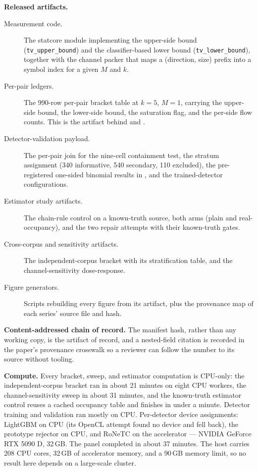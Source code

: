 \documentclass[letterpaper,twocolumn,10pt]{article}
\begin{document}
\textbf{Released artifacts.}
\begin{description}
  \item[Measurement code.] The statcore module implementing the upper-side
  bound (\texttt{tv\_upper\_bound}) and the classifier-based lower bound
  (\texttt{tv\_lower\_bound}), together with the channel packer that maps a
  (direction, size) prefix into a symbol index for a given $M$ and $k$.
  \item[Per-pair ledgers.] The 990-row per-pair bracket table at $k{=}5$,
  $M{=}1$, carrying the upper-side bound, the lower-side bound, the saturation
  flag, and the per-side flow counts. This is the artifact behind
   and .
  \item[Detector-validation payload.] The per-pair join for the nine-cell
  containment test, the stratum assignment (340 informative, 540 secondary,
  110 excluded), the pre-registered one-sided binomial results in
  , and the trained-detector configurations.
  \item[Estimator study artifacts.] The chain-rule control on a known-truth
  source, both arms (plain and real-occupancy), and the two repair attempts
  with their known-truth gates.
  \item[Cross-corpus and sensitivity artifacts.] The independent-corpus bracket
  with its stratification table, and the channel-sensitivity dose-response.
  \item[Figure generators.] Scripts rebuilding every figure from its artifact,
  plus the provenance map of each series' source file and hash.
\end{description}

\textbf{Content-addressed chain of record.}
The manifest hash, rather than any working copy, is the artifact of record, and a
nested-field citation is recorded in the paper's provenance crosswalk so a
reviewer can follow the number to its source without tooling.

\textbf{Compute.}
\label{sec:appendix/compute}
Every bracket, sweep, and estimator computation is CPU-only: the
independent-corpus bracket ran in about 21 minutes on eight CPU workers, the
channel-sensitivity sweep in about 31 minutes, and the known-truth estimator
control reuses a cached occupancy table and finishes in under a minute. Detector
training and validation ran mostly on CPU. Per-detector device assignments:
LightGBM on CPU (its OpenCL attempt found no device and fell back), the
prototype rejector on CPU, and RoNeTC on the accelerator --- NVIDIA GeForce
RTX 5090 D, 32\,GB. The panel completed in about 37 minutes. The host carries
208 CPU cores, 32\,GB of accelerator memory, and a 90\,GB memory limit, so no
result here depends on a large-scale cluster.
\end{document}
